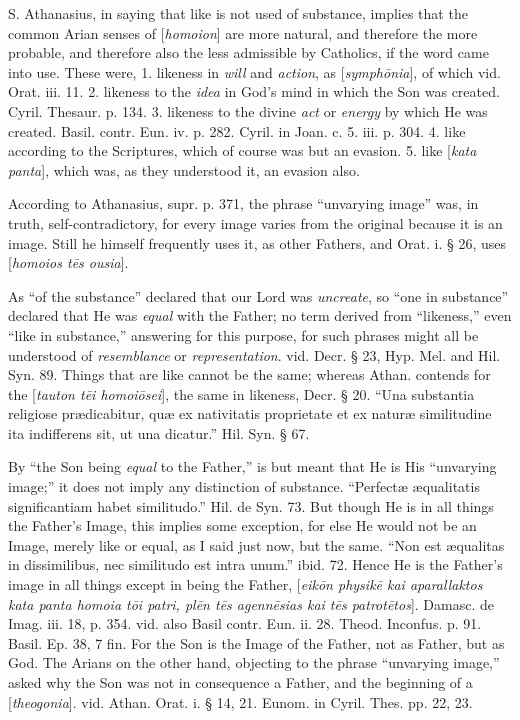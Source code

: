 S. Athanasius, in saying that like is not used of
substance, implies that the common Arian senses of [\emph{homoion}]
are more natural, and therefore the more probable, and therefore also
the less admissible by Catholics, if the word came into use. These
were, 1. likeness in \emph{will} and \emph{action}, as [\emph{symph\={o}nia}],
of which vid. Orat. iii. 11. 2. likeness to the \emph{idea} in God's
mind in which the Son was created. Cyril. Thesaur. p. 134. 3. likeness
to the divine \emph{act} or \emph{energy} by which He was created.
Basil. contr. Eun. iv. p. 282. Cyril. in Joan. c. 5. iii. p. 304. 4.
like according to the Scriptures, which of course was but an evasion.
5. like [\emph{kata panta}], which was, as they understood it, an
evasion also.

According to Athanasius, supr. p. 371, the phrase
``unvarying image'' was, in truth, self-contradictory, for every image
varies from the original because it is an image. Still he himself
frequently uses it, as other Fathers, and Orat. i. § 26, uses [\emph{homoios
t\={e}s ousia}].

As ``of the substance'' declared that our Lord was \emph{uncreate},
so ``one in substance'' declared that He was \emph{equal} with the
Father; no term derived from ``likeness,'' even ``like in
substance,'' answering for this purpose, for such phrases might all be
understood of \emph{resemblance} or \emph{representation}. vid. Decr.
§ 23, Hyp. Mel. and Hil. Syn. 89. Things that are like cannot be the
same; whereas Athan. contends for the [\emph{tauton t\={e}i homoi\={o}sei}],
the same in likeness, Decr. § 20. ``Una substantia religiose prædicabitur,
quæ ex nativitatis proprietate et ex naturæ similitudine ita
indifferens sit, ut una dicatur.'' Hil. Syn. § 67.

By ``the Son being \emph{equal} to the Father,'' is
but meant that He is His ``unvarying image;'' it does not imply any
distinction of substance. ``Perfectæ æqualitatis significantiam habet
similitudo.'' Hil. de Syn. 73. But though He is in all things the
Father's Image, this implies some exception, for else He would not be
an Image, merely like or equal, as I said just now, but the same. ``Non
est æqualitas in dissimilibus, nec similitudo est intra unum.'' ibid.
72. Hence He is the Father's image in all things except in being the
Father, [\emph{eik\={o}n physik\={e} kai aparallaktos kata panta
homoia t\={o}i patri, pl\={e}n t\={e}s agenn\={e}sias kai
t\={e}s patrot\={e}tos}]. Damasc. de Imag. iii. 18, p. 354.
vid. also Basil contr. Eun. ii. 28. Theod. Inconfus. p. 91. Basil. Ep.
38, 7 fin. For the Son is the Image of the Father, not as Father, but
as God. The Arians on the other hand, objecting to the phrase ``unvarying
image,'' asked why the Son was not in consequence a Father, and the
beginning of a [\emph{theogonia}]. vid. Athan. Orat. i. § 14, 21.
Eunom. in Cyril. Thes. pp. 22, 23.

